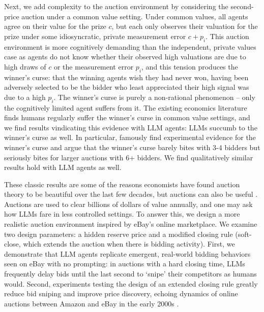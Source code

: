 \documentclass{article} %
\newcommand{\kibitz}[2]{\ifnum\Comments=1{\color{#1}{#2}}\fi}
\newcommand{\avs}[1]{\kibitz{purple}{[avs: #1]}}
\begin{document}
Next, we add complexity to the auction environment by considering the second-price auction under a common value setting. Under common values, all agents agree on their value for the prize $c$, but each only observes their valuation for the prize under some idiosyncratic, private measurement error $c + p_i$. This auction environment is more cognitively demanding than the independent, private values case as agents do not know whether their observed high valuations are due to high draws of $c$ or the measurement error $p_i$, and this tension produces the winner's curse: that the winning agents wish they had never won, having been adversely selected to be the bidder who least appreciated their high signal was due to a high $p_i$. The winner's curse is purely a non-rational phenomenon -- only the cognitively limited agent suffers from it. The existing economics literature finds humans regularly suffer the winner's curse in common value settings, and we find results vindicating this evidence with LLM agents: LLMs succumb to the winner's curse as well. In particular, \citet{kagel1986winner} famously find experimental evidence for the winner's curse and argue that the winner's curse barely bites with 3-4 bidders but seriously bites for larger auctions with 6+ bidders. We find qualitatively similar results hold with LLM agents as well. 


These classic results are some of the reasons economists have found auction theory to be beautiful over the last few decades, but auctions can also be useful \citep{milgrom2020clock}. Auctions are used to clear billions of dollars of value annually, and one may ask how LLMs fare in less controlled settings. To answer this, we design a more realistic auction environment inspired by eBay's online marketplace. We examine two design parameters: a hidden reserve price and a modified closing rule (soft-close, which extends the auction when there is bidding activity). First, we demonstrate that LLM agents replicate emergent, real-world bidding behaviors seen on eBay with no prompting: in auctions with a hard closing time, LLMs frequently delay bids until the last second to `snipe' their competitors as humans would. Second, experiments testing the design of an extended closing rule greatly reduce bid sniping and improve price discovery, echoing dynamics of online auctions between Amazon and eBay in the early 2000s \citep{roth2002last}.
\end{document}
